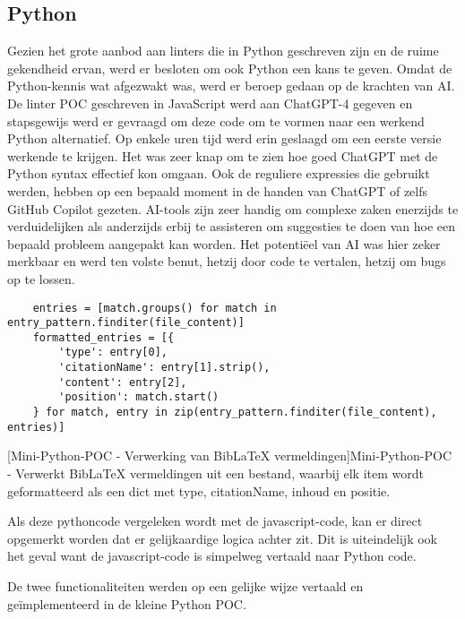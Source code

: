 \subsection{Python}
\label{subsec:python}
Gezien het grote aanbod aan linters die in Python geschreven zijn en de ruime gekendheid ervan, werd er besloten om ook Python een kans te geven. Omdat de Python-kennis wat afgezwakt was, werd er beroep gedaan op de krachten van \acrshort{AI}. De linter \acrfull{POC} geschreven in JavaScript werd aan ChatGPT-4 gegeven en stapsgewijs werd er gevraagd om deze code om te vormen naar een werkend Python alternatief. Op enkele uren tijd werd erin geslaagd om een eerste versie werkende te krijgen. Het was zeer knap om te zien hoe goed ChatGPT met de Python syntax effectief kon omgaan. Ook de reguliere expressies die gebruikt werden, hebben op een bepaald moment in de handen van ChatGPT of zelfs GitHub Copilot gezeten. \acrshort{AI}-tools zijn zeer handig om complexe zaken enerzijds te verduidelijken als anderzijds erbij te assisteren om suggesties te doen van hoe een bepaald probleem aangepakt kan worden. Het potentiëel van \acrshort{AI} was hier zeker merkbaar en werd ten volste benut, hetzij door code te vertalen, hetzij om bugs op te lossen.


\begin{verbatim}
    entries = [match.groups() for match in entry_pattern.finditer(file_content)]
    formatted_entries = [{
        'type': entry[0],
        'citationName': entry[1].strip(),
        'content': entry[2],
        'position': match.start()
    } for match, entry in zip(entry_pattern.finditer(file_content), entries)]
\end{verbatim}
[Mini-Python-\acrshort{POC} - Verwerking van BibLaTeX vermeldingen]{Mini-Python-\acrshort{POC} - Verwerkt BibLaTeX vermeldingen uit een bestand, waarbij elk item wordt geformatteerd als een dict met type, citationName, inhoud en positie. \label{lst:mini_python_poc_file_content_processing}}

Als deze pythoncode vergeleken wordt met de javascript-code, kan er direct opgemerkt worden dat er gelijkaardige logica achter zit. Dit is uiteindelijk ook het geval want de javascript-code is simpelweg vertaald naar Python code.

De twee functionaliteiten werden op een gelijke wijze vertaald en geïmplementeerd in de kleine Python \acrfull{POC}.


